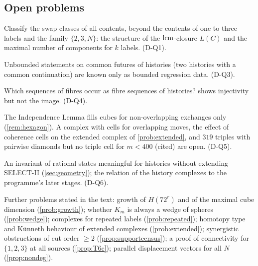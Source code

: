 \subsection{Open problems}
\begin{problem}\label{prob:classify}
Classify the swap classes of all contents, beyond the contents of one to three labels and the family $\{2,3,N\}$: the structure of the $\operatorname{lcm}$-closure $L(C)$ and the maximal number of components for $k$ labels.  (D-Q1).
\end{problem}
\begin{problem}\label{prob:futures}
Unbounded statements on common futures of histories (two histories with a common continuation) are known only as bounded regression data.  (D-Q3).
\end{problem}
\begin{problem}\label{prob:image}
Which sequences of fibres occur as fibre sequences of histories?  shows injectivity but not the image.  (D-Q4).
\end{problem}
\begin{problem}\label{prob:overlap}
The Independence Lemma fills cubes for non-overlapping exchanges only (\cref{rem:hexagon}). A complex with cells for overlapping moves, the effect of coherence cells on the extended complex of \cref{prob:extended}, and $319$ triples with pairwise diamonds but no triple cell for $m<400$ (cited) are open.  (D-Q5).
\end{problem}
\begin{problem}\label{prob:interface}
An invariant of rational states meaningful for histories without extending SELECT-II (\cref{sec:geometry}); the relation of the history complexes to the programme's later stages.  (D-Q6).
\end{problem}
Further problems stated in the text: growth of $H(72^r)$ and of the maximal cube dimension (\cref{prob:growth}); whether $K_m$ is always a wedge of spheres (\cref{prob:wedge}); complexes for repeated labels (\cref{prob:repeated}); homotopy type and Künneth behaviour of extended complexes (\cref{prob:extended}); synergistic obstructions of cut order $\ge2$ (\cref{prop:supportcensus}); a proof of connectivity for $\{1,2,3\}$ at all sources (\cref{prop:T6c}); parallel displacement vectors for all $N$ (\cref{prop:nondeg}).
